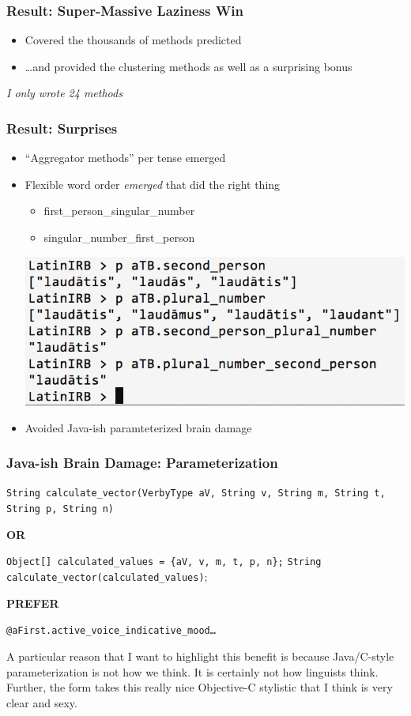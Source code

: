 \documentclass[slidestop,compress,mathserif]{beamer}
\begin{document}
\begin{frame}
	\frametitle{Result:  Super-Massive Laziness Win}
	\begin{itemize}
		\item Covered the thousands of methods predicted
		\pause
		\item \ldots and provided the clustering methods as well as a surprising bonus
	\end{itemize}
	\pause
	\vskip 0.5cm
	\emph{I only wrote 24 methods}
\end{frame}

\begin{frame}
	\frametitle{Result:  Surprises}
	\begin{itemize}
		\item ``Aggregator methods'' per tense emerged
		\pause
		\item Flexible word order \emph{emerged} that did the right thing
		\begin{itemize}
			\item first\_person\_singular\_number
			\item singular\_number\_first\_person
		\end{itemize}
		\includegraphics[scale=0.38]{img/conj_subspec.png}
		\pause
		\item Avoided Java-ish paramteterized brain damage
	\end{itemize}
\end{frame}


\begin{frame}
	\frametitle{Java-ish Brain Damage:  Parameterization}
 	\texttt{String calculate\_vector(VerbyType aV, String v, String m, String t, String p, String n)}
	\vskip 0.5cm

	\begin{center}
		\textbf{OR}
	\end{center}

	\vskip 0.5cm
	\texttt{Object[] calculated\_values = \{aV, v, m, t, p, n\};}
	\texttt{String calculate\_vector(calculated\_values)};
	\vskip 0.5cm

	\begin{center}
		\textbf{PREFER}
	\end{center}

	\vskip 0.5cm
	\texttt{@aFirst.active\_voice\_indicative\_mood{\ldots}}
\end{frame}
\note
{A particular reason that I want to highlight this benefit is because
Java/C-style parameterization is not how we think. It is certainly not how
linguists think. Further, the form takes this really nice Objective-C
stylistic that I think is very clear and sexy.
}
\end{document}
